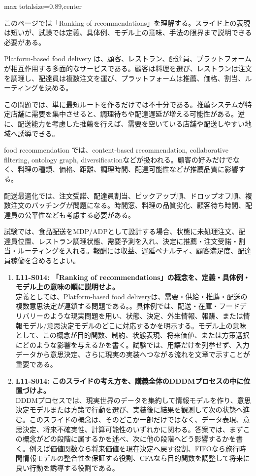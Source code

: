 \begin{minipage}[t]{0.58\textwidth}
\begin{adjustbox}{max totalsize={\textwidth}{0.89\textheight},center}
\begin{minipage}{\textwidth}\scriptsize
{}このページでは「Ranking of recommendations」を理解する。スライド上の表現は短いが、試験では定義、具体例、モデル上の意味、手法の限界まで説明できる必要がある。\par
Platform-based food delivery は、顧客、レストラン、配達員、プラットフォームが相互作用する多面的なサービスである。顧客は料理を選び、レストランは注文を調理し、配達員は複数注文を運び、プラットフォームは推薦、価格、割当、ルーティングを決める。\par
この問題では、単に最短ルートを作るだけでは不十分である。推薦システムが特定店舗に需要を集中させると、調理待ちや配達遅延が増える可能性がある。逆に、配送能力を考慮した推薦を行えば、需要を空いている店舗や配送しやすい地域へ誘導できる。\par
food recommendation では、content-based recommendation, collaborative filtering, ontology graph, diversificationなどが扱われる。顧客の好みだけでなく、料理の種類、価格、距離、調理時間、配達可能性などが推薦品質に影響する。\par
配送最適化では、注文受諾、配達員割当、ピックアップ順、ドロップオフ順、複数注文のバッチングが問題になる。時間窓、料理の品質劣化、顧客待ち時間、配達員の公平性なども考慮する必要がある。\par
試験では、食品配送をMDP/ADPとして設計する場合、状態に未処理注文、配達員位置、レストラン調理状態、需要予測を入れ、決定に推薦・注文受諾・割当・ルーティングを入れる。報酬には収益、遅延ペナルティ、顧客満足度、配達員稼働を含めるとよい。\par{}\begin{enumerate}\item \textbf{L11-S014: 「Ranking of recommendations」の概念を、定義・具体例・モデル上の意味の順に説明せよ。}\\定義としては、Platform-based food deliveryは、需要・供給・推薦・配送の複数意思決定が連鎖する問題である。。具体例では、配送・在庫・フードデリバリーのような現実問題を用い、状態、決定、外生情報、報酬、または情報モデル/意思決定モデルのどこに対応するかを明示する。モデル上の意味として、この概念が目的関数、制約、状態表現、将来価値、または方策選択にどのような影響を与えるかを書く。試験では、用語だけを列挙せず、入力データから意思決定、さらに現実の実装へつながる流れを文章で示すことが重要である。\item \textbf{L11-S014: このスライドの考え方を、講義全体のDDDMプロセスの中に位置づけよ。}\\DDDMプロセスでは、現実世界のデータを集約して情報モデルを作り、意思決定モデルまたは方策で行動を選び、実装後に結果を観測して次の状態へ進む。このスライドの概念は、そのどこか一部だけではなく、データ表現、意思決定、将来不確実性、計算可能性のいずれかに関わる。答案では、まずこの概念がどの段階に属するかを述べ、次に他の段階へどう影響するかを書く。例えば価値関数なら将来価値を現在決定へ戻す役割、FIFOなら旅行時間情報モデルの整合性を保証する役割、CFAなら目的関数を調整して将来に良い行動を誘導する役割である。\end{enumerate}

\end{minipage}
\end{adjustbox}
\end{minipage}
